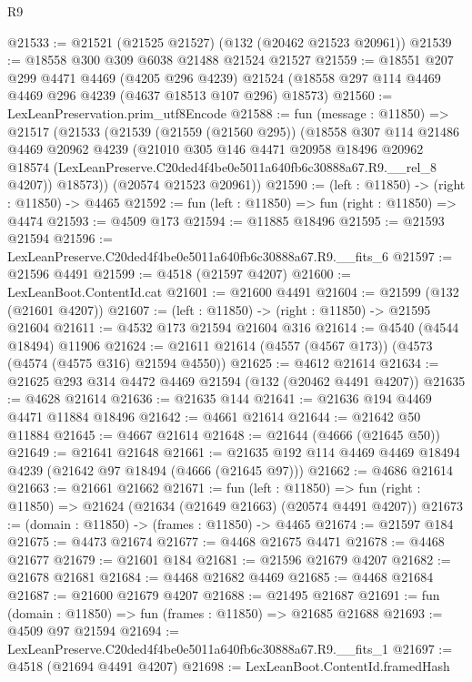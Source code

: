 \begin{lexlean}{R9}
\begin{coremodule}
@21533 := @21521 (@21525 @21527) (@132 (@20462 @21523 @20961))
@21539 := @18558 @300 @309 @6038 @21488 @21524 @21527
@21559 := @18551
    @207
    @299
    @4471
    @4469
    (@4205 @296 @4239)
    @21524
    (@18558 @297 @114 @4469 @4469 @296 @4239 (@4637 @18513 @107 @296) @18573)
@21560 := LexLeanPreservation.prim_utf8Encode
@21588 := fun (message : @11850) =>
  @21517
    (@21533
      (@21539
        (@21559 (@21560 @295))
        (@18558
          @307
          @114
          @21486
          @4469
          @20962
          @4239
          (@21010
            @305
            @146
            @4471
            @20958
            @18496
            @20962
            @18574
            (LexLeanPreserve.C20ded4f4be0e5011a640fb6c30888a67.R9.__rel_8 @4207))
          @18573))
      (@20574 @21523 @20961))
@21590 := (left : @11850) -> (right : @11850) -> @4465
@21592 := fun (left : @11850) => fun (right : @11850) => @4474
@21593 := @4509 @173
@21594 := @11885 @18496
@21595 := @21593 @21594
@21596 := LexLeanPreserve.C20ded4f4be0e5011a640fb6c30888a67.R9.__fits_6
@21597 := @21596 @4491
@21599 := @4518 (@21597 @4207)
@21600 := LexLeanBoot.ContentId.cat
@21601 := @21600 @4491
@21604 := @21599 (@132 (@21601 @4207))
@21607 := (left : @11850) -> (right : @11850) -> @21595 @21604
@21611 := @4532 @173 @21594 @21604 @316
@21614 := @4540 (@4544 @18494) @11906
@21624 := @21611 @21614 (@4557 (@4567 @173)) (@4573 (@4574 (@4575 @316) @21594 @4550))
@21625 := @4612 @21614
@21634 := @21625 @293 @314 @4472 @4469 @21594 (@132 (@20462 @4491 @4207))
@21635 := @4628 @21614
@21636 := @21635 @144
@21641 := @21636 @194 @4469 @4471 @11884 @18496
@21642 := @4661 @21614
@21644 := @21642 @50 @11884
@21645 := @4667 @21614
@21648 := @21644 (@4666 (@21645 @50))
@21649 := @21641 @21648
@21661 := @21635 @192 @114 @4469 @4469 @18494 @4239 (@21642 @97 @18494 (@4666 (@21645 @97)))
@21662 := @4686 @21614
@21663 := @21661 @21662
@21671 := fun (left : @11850) =>
  fun (right : @11850) => @21624 (@21634 (@21649 @21663) (@20574 @4491 @4207))
@21673 := (domain : @11850) -> (frames : @11850) -> @4465
@21674 := @21597 @184
@21675 := @4473 @21674
@21677 := @4468 @21675 @4471
@21678 := @4468 @21677
@21679 := @21601 @184
@21681 := @21596 @21679 @4207
@21682 := @21678 @21681
@21684 := @4468 @21682 @4469
@21685 := @4468 @21684
@21687 := @21600 @21679 @4207
@21688 := @21495 @21687
@21691 := fun (domain : @11850) => fun (frames : @11850) => @21685 @21688
@21693 := @4509 @97 @21594
@21694 := LexLeanPreserve.C20ded4f4be0e5011a640fb6c30888a67.R9.__fits_1
@21697 := @4518 (@21694 @4491 @4207)
@21698 := LexLeanBoot.ContentId.framedHash

\end{coremodule}
\end{lexlean}
